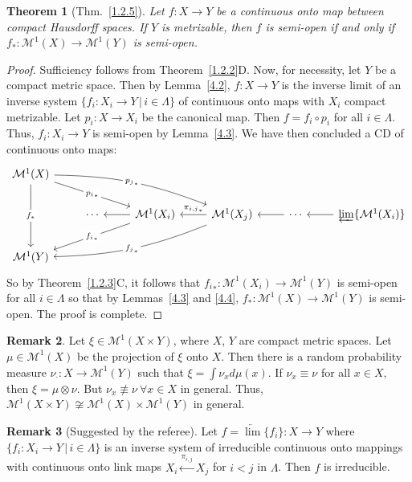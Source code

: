\documentclass[12pt,final,3p,times]{elsarticle}
\newtheorem{thm}{Theorem}[section]
\theoremstyle{definition}
\newtheorem{rem}[thm]{Remark}
\numberwithin{equation}{section}
\begin{document}
\begin{thm}[Thm.~\ref{1.2.5}]\label{4.5}
Let $f\colon X\rightarrow Y$ be a continuous onto map between compact Hausdorff spaces. If $Y$ is metrizable, then $f$ is semi-open if and only if  $f_*\colon\mathcal{M}^1(X)\rightarrow\mathcal{M}^1(Y)$ is semi-open.
\end{thm}

\begin{proof}
Sufficiency follows from Theorem~\ref{1.2.2}D. Now, for necessity, let $Y$ be a compact metric space. Then by Lemma~\ref{4.2}, $f\colon X\rightarrow Y$ is the inverse limit of an inverse system
$\{f_i\colon X_i\rightarrow Y\,|\,i\in\Lambda\}$
of continuous onto maps with $X_i$ compact metrizable. Let $p_i\colon X\rightarrow X_i$ be the canonical map. Then $f=f_i\circ p_i$ for all $i\in\Lambda$.
Thus, $f_i\colon X_i\rightarrow Y$ is semi-open by Lemma~\ref{4.3}. We have then concluded a CD of continuous onto maps:
$$
\begin{tikzcd}
	\mathcal{M}^1(X)
	\arrow[drr, "{p_i}_*"description]
	\arrow[drrr, "{p_j}_*"description, bend left=10]
	\arrow[dd, "f_*" description] &&&& \\
	& \cdots & \mathcal{M}^1(X_i) \arrow[l] \arrow[lld, "{f_i}_*"description] & \mathcal{M}^1(X_j) \arrow[l, "{\pi_{i,j}}_*"'] \arrow[llld, "{f_j}_*"description, bend left=10]
	&\cdots \arrow[l]& \underleftarrow{\lim}\{\mathcal{M}^1(X_i)\} \arrow[l] \\
	\mathcal{M}^1(Y)&&&&
\end{tikzcd}
$$
So by Theorem~\ref{1.2.3}C, it follows that ${f_i}_*\colon \mathcal{M}^1(X_i)\rightarrow\mathcal{M}^1(Y)$ is semi-open for all $i\in\Lambda$ so that by Lemmas~\ref{4.3} and \ref{4.4}, $f_*\colon\mathcal{M}^1(X)\rightarrow\mathcal{M}^1(Y)$ is semi-open. The proof is complete.
\end{proof}

\begin{rem}\label{4.6}
    Let $\xi\in\mathcal{M}^1(X\times Y)$, where $X$, $Y$ are compact metric spaces. Let $\mu\in\mathcal{M}^1(X)$ be the projection of $\xi$ onto $X$. Then there is a random probability measure $\nu_\cdot\colon X\rightarrow\mathcal{M}^1(Y)$ such that $\xi=\int\nu_xd\mu(x)$. If $\nu_x\equiv\nu$ for all $x\in X$, then $\xi=\mu\otimes\nu$. But $\nu_x\not\equiv\nu\ \forall x\in X$ in general. Thus, $\mathcal{M}^1(X\times Y)\not\cong\mathcal{M}^1(X)\times\mathcal{M}^1(Y)$ in general.
\end{rem}

\begin{rem}[Suggested by the referee]\label{4.7}
  Let $f=\underleftarrow{\lim}\{f_i\}\colon X\rightarrow Y$ where $\{f_i\colon X_i\rightarrow Y\,|\,i\in\Lambda\}$ is an inverse system of irreducible continuous onto mappings with continuous onto link maps $X_i\xleftarrow{\pi_{i,j}}X_j$ for $i<j$ in $\Lambda$. Then $f$ is irreducible.
\end{rem}
\end{document}
